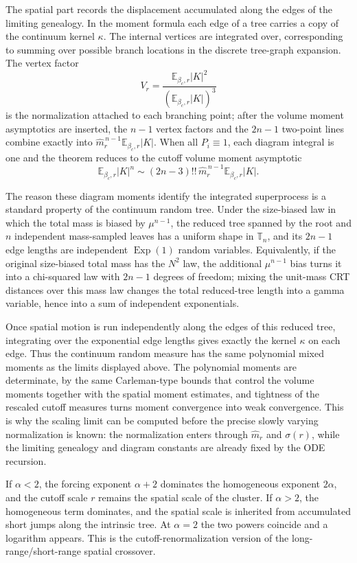 \documentclass[11pt,reqno]{book}
\numberwithin{equation}{chapter}
\theoremstyle{plain}
\theoremstyle{definition}
\theoremstyle{remark}
\newcommand{\E}{\mathbb E}
\newcommand{\1}{\mathbf 1}
\begin{document}
The spatial part records the displacement accumulated along the edges of the
limiting genealogy. In the moment formula each edge of a tree carries a copy
of the continuum kernel \(\kappa\). The internal vertices are integrated over,
corresponding to summing over possible branch locations in the discrete
tree-graph expansion. The vertex factor
\[
  V_r=\frac{\E_{\beta_c,r}|K|^2}{(\E_{\beta_c,r}|K|)^3}
\]
is the normalization attached to each branching point; after the volume
moment asymptotics are inserted, the \(n-1\) vertex factors and the \(2n-1\)
two-point lines combine exactly into
\(\widehat m_r^{\,n-1}\E_{\beta_c,r}|K|\). When all \(P_i\equiv1\), each
diagram integral is one and the theorem reduces to the cutoff volume moment
asymptotic
\[
  \E_{\beta_c,r}|K|^n
  \sim
  (2n-3)!!\,\widehat m_r^{\,n-1}\E_{\beta_c,r}|K|.
\]

The reason these diagram moments identify the integrated superprocess is a
standard property of the continuum random tree. Under the size-biased law in
which the total mass is biased by \(\mu^{n-1}\), the reduced tree spanned by
the root and \(n\) independent mass-sampled leaves has a uniform shape in
\(\mathbb T_n\), and its \(2n-1\) edge lengths are independent
\(\operatorname{Exp}(1)\) random variables. Equivalently, if the original
size-biased total mass has the \(N^2\) law, the additional \(\mu^{n-1}\) bias
turns it into a chi-squared law with \(2n-1\) degrees of freedom; mixing the
unit-mass CRT distances over this mass law changes the total reduced-tree
length into a gamma variable, hence into a sum of independent exponentials.

Once spatial motion is run independently along the edges of this reduced
tree, integrating over the exponential edge lengths gives exactly the kernel
\(\kappa\) on each edge. Thus the continuum random measure has the same
polynomial mixed moments as the limits displayed above. The polynomial
moments are determinate, by the same Carleman-type bounds that control the
volume moments together with the spatial moment estimates, and tightness of
the rescaled cutoff measures turns moment convergence into weak convergence.
This is why the scaling limit can be computed before the precise slowly
varying normalization is known: the normalization enters through
\(\widehat m_r\) and \(\sigma(r)\), while the limiting genealogy and diagram
constants are already fixed by the ODE recursion.

If $\alpha<2$, the forcing exponent $\alpha+2$ dominates the homogeneous exponent $2\alpha$, and the cutoff scale $r$ remains the spatial scale of the cluster. If $\alpha>2$, the homogeneous term dominates, and the spatial scale is inherited from accumulated short jumps along the intrinsic tree. At $\alpha=2$ the two powers coincide and a logarithm appears. This is the cutoff-renormalization version of the long-range/short-range spatial crossover.
\end{document}
